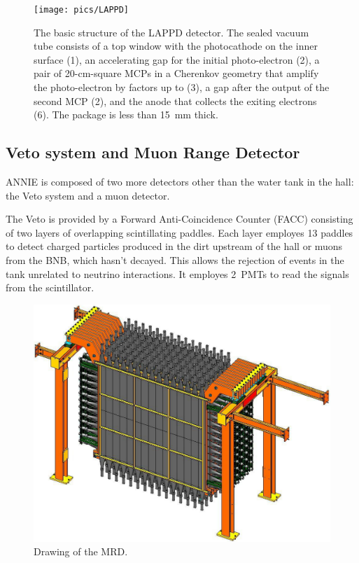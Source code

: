  \begin{figure}[]
   \centering
   \texttt{[image: pics/LAPPD]}
   \caption{The basic structure of the LAPPD detector. %
     The sealed vacuum tube consists of a top window with the photocathode on the inner surface (1), %
     an accelerating gap for the initial photo-electron (2), a pair of 20-cm-square MCPs in a Cherenkov geometry that %
     amplify the photo-electron by factors up to  (3), a gap after the output of the second MCP (2), %
     and the anode that collects the exiting electrons (6). The package is less than 15~mm thick.}
   \label{fig:LAPPD}
 \end{figure}


 \subsection[Veto and MRD]{Veto system and Muon Range Detector}
 \label{2.3}

 ANNIE is composed of two more detectors other than the water tank in the hall: the Veto system %
 and a muon detector.

 The Veto is provided by a Forward Anti-Coincidence Counter (FACC) consisting of two layers %
 of overlapping scintillating paddles.
 Each layer employes 13 paddles to detect charged particles produced in the dirt %
 upstream of the hall or muons from the BNB, which hasn't decayed.
 This allows the rejection of events in the tank unrelated to neutrino interactions.
 It employes 2\inch~PMTs to read the signals from the scintillator.

 \begin{figure}
   \centering
   \includegraphics[scale=.15]{pics/pag23Nakajimathesis}
   \caption{Drawing of the MRD.}
   \label{fig:mrd}
 \end{figure}
 

